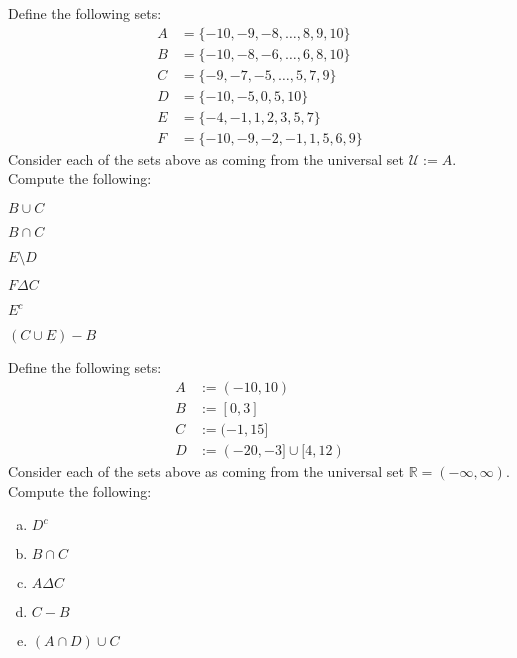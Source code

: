 \documentclass[11pt,letterpaper]{article}
\begin{document}
\newpage



 Define the following sets:
	\[
	\begin{aligned}
	A&= \{ -10, -9, -8, \ldots, 8, 9, 10 \} \\
	B&= \{ -10, -8, -6, \ldots, 6, 8, 10 \} \\
	C&= \{ -9, -7, -5, \ldots, 5, 7, 9 \} \\
	D&= \{ -10, -5, 0, 5, 10 \} \\
	E&= \{ -4, -1, 1, 2, 3, 5, 7 \} \\
	F&= \{ -10, -9, -2, -1, 1, 5, 6, 9 \}
	\end{aligned}
	\]
Consider each of the sets above as coming from the universal set $\mathcal{U}:= A$. Compute the following:
	\begin{2enumerate}
	\item $B \cup C$
	\item $B \cap C$
	\item $E \setminus D$
	\item $F \Delta C$
	\item $E^c$
	\item $(C \cup E) - B$
	\end{2enumerate}



\newpage



 Define the following sets:
	\[
	\begin{aligned}
	A&:= (-10, 10) \\
	B&:= [0, 3] \\
	C&:= (-1, 15] \\
	D&:= (-20, -3] \cup [4, 12)
	\end{aligned}
	\]
Consider each of the sets above as coming from the universal set $\mathbb{R}= (-\infty, \infty)$. Compute the following:
	\begin{enumerate}[(a)]
	\item $D^c$
	\item $B \cap C$
	\item $A \Delta C$
	\item $C - B$
	\item $(A \cap D) \cup C$
	\end{enumerate}
\end{document}
